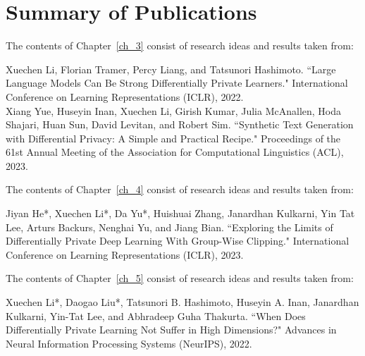 \newpage
\section{Summary of Publications}

\noindent The contents of Chapter~\ref{ch_3} consist of research ideas and results taken from:

\begin{mdframed}[leftline=true, topline=false, rightline=false, bottomline=false, linewidth=2pt]
Xuechen Li, Florian Tramer, Percy Liang, and Tatsunori Hashimoto. ``Large Language Models Can Be Strong Differentially Private Learners." International Conference on Learning Representations (ICLR), 2022.~\cite{li2022large}\\

\noindent Xiang Yue, Huseyin Inan, Xuechen Li, Girish Kumar, Julia McAnallen, Hoda Shajari, Huan Sun, David Levitan, and Robert Sim. ``Synthetic Text Generation with Differential Privacy: A Simple and Practical Recipe." Proceedings of the 61st Annual Meeting of the Association for Computational Linguistics (ACL), 2023.~\cite{yue-etal-2023-synthetic}
\end{mdframed}

\noindent The contents of Chapter~\ref{ch_4} consist of research ideas and results taken from:

\begin{mdframed}[leftline=true, topline=false, rightline=false, bottomline=false, linewidth=2pt]
Jiyan He*, Xuechen Li*, Da Yu*, Huishuai Zhang, Janardhan Kulkarni, Yin Tat Lee, Arturs Backurs, Nenghai Yu, and Jiang Bian. ``Exploring the Limits of Differentially Private Deep Learning With Group-Wise Clipping." International Conference on Learning Representations (ICLR), 2023.~\cite{he2022exploring}
\end{mdframed}

\noindent The contents of Chapter~\ref{ch_5} consist of research ideas and results taken from:

\begin{mdframed}[leftline=true, topline=false, rightline=false, bottomline=false, linewidth=2pt]
Xuechen Li*, Daogao Liu*, Tatsunori B. Hashimoto, Huseyin A. Inan, Janardhan Kulkarni, Yin-Tat Lee, and Abhradeep Guha Thakurta. ``When Does Differentially Private Learning Not Suffer in High Dimensions?" Advances in Neural Information Processing Systems (NeurIPS), 2022.~\cite{li2022does}
\end{mdframed}


